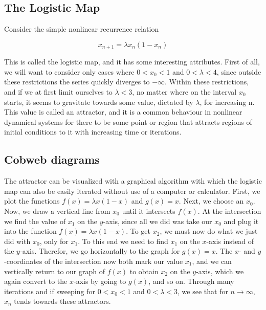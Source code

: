 \documentclass[12pt,oneside,a4paper]{article}
\numberwithin{equation}{section}
\begin{document}
{{{{\subsection{The Logistic Map}

Consider the simple nonlinear recurrence relation


\begin{equation}
x_{n+1}=\lambda x_n (1-x_n)
\end{equation}


This is called the logistic map, and it has some interesting attributes. First of all, we will want to consider only cases where $0<x_0<1$ and $0<\lambda<4$, since outside these restrictions the series quickly diverges to $-\infty$. Within these restrictions, and if we at first limit ourselves to $\lambda<3$, no matter where on the interval $x_0$ starts, it seems to gravitate towards some value, dictated by $\lambda$, for increasing n. This value is called an attractor, and it is a common behaviour in nonlinear dynamical systems for there to be some point or region that attracts regions of initial conditions to it with increasing time or iterations.

\subsection{Cobweb diagrams}
The attractor can be visualized with a graphical algorithm with which the logistic map can also be easily iterated without use of a computer or calculator. First, we plot the functions $f(x)=\lambda x (1-x)$ and $g(x)=x$. Next, we choose an $x_0$. Now, we draw a vertical line from $x_0$ until it intersects $f(x)$. At the intersection we find the value of $x_1$ on the $y$-axis, since all we did was take our $x_0$ and plug it into the function $f(x)=\lambda x (1-x)$. To get $x_2$, we must now do what we just did with $x_0$, only for $x_1$. To this end we need to find $x_1$ on the $x$-axis instead of the $y$-axis. Therefor, we go horizontally to the graph for $g(x)=x$. The $x$- and $y$-coordinates of the intersection now both mark our value $x_1$, and we can vertically return to our graph of $f(x)$ to obtain $x_2$ on the $y$-axis, which we again convert to the $x$-axis by going to $g(x)$, and so on. Through many iterations and if sweeping for $0<x_0<1$ and $0<\lambda<3$, we see that for $n\to \infty$, $x_n$ tends towards these attractors. 



}}}}
\end{document}
